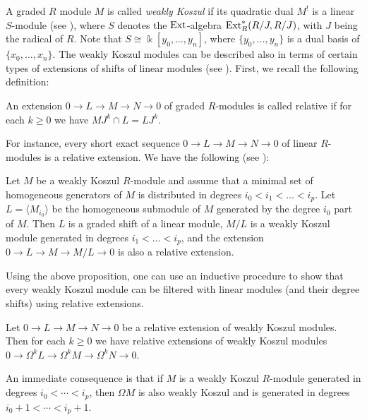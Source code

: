 \documentclass[10pt]{amsart}
\begin{document}
\noindent A graded $R$ module $M$ is called {\it weakly Koszul} if its quadratic dual 
$M^!$ is a linear $S$-module (see \cite{GM,HI}), where $S$ denotes the 
$\operatorname{Ext}\nolimits$-algebra $\operatorname{Ext}\nolimits^*_R(R/{J} ,R/{J})$, with $J$ being the radical of $R$. Note that $S\cong\Bbbk [y_0,\ldots ,y_n]$, where $\{y_0,\ldots ,y_n\}$ is a dual basis of $\{x_0,\ldots ,x_n\}$.
The weakly Koszul modules 
can be described also in terms of certain types of extensions of shifts of linear modules (see \cite[p. 679]{MVZ1}). 
First, we recall the following definition:

\begin{dfn} An extension $0\rightarrow L\rightarrow M\rightarrow N\rightarrow 0$ of graded $R$-modules is called 
relative if for each $k\ge 0$ we have $MJ^k\cap L=LJ^k$. 
\end{dfn}

\noindent For instance, every short exact sequence $0\rightarrow L\rightarrow M\rightarrow N\rightarrow 0$ of linear 
$R$-modules is a relative extension. We have the following (see \cite{MVZ1}):

\begin{pro}\label{filtration by linear}
Let $M$ be a weakly Koszul $R$-module and assume that a minimal set of homogeneous 
generators of $M$ is distributed in degrees $i_0<i_1<\ldots <i_p$. Let $L=\langle M_{i_0}\rangle$ 
be the homogeneous submodule of $M$ generated by the degree $i_0$ part of $M$. Then $L$ is a 
graded shift of a linear module, $M/L$ is a weakly Koszul module generated in degrees $i_1<\ldots <i_p$, 
and the extension $0\rightarrow L\rightarrow M\rightarrow M/L\rightarrow 0$ is also a relative extension.
\end{pro}

\noindent Using the above proposition, one can use an inductive procedure to show that every weakly 
Koszul module can be filtered with linear modules (and their degree shifts) using relative extensions.

\begin{pro}\label{syzygy behavior} Let $0\rightarrow L\rightarrow M\rightarrow N\rightarrow 0$ 
be a relative extension of weakly Koszul modules. 
Then for each $k\ge 0$ we have relative extensions of weakly Koszul modules 
$0\rightarrow\Omega^k L\rightarrow\Omega^k M\rightarrow\Omega^k N\rightarrow 0$.
\end{pro}


\noindent An immediate consequence is that if  $M$ is a weakly Koszul $R$-module generated in 
degrees $i_0<\cdots <i_p$, then $\Omega M$ is also weakly Koszul and is generated in 
degrees $i_0+1<\cdots <i_p+1$.  
\end{document}

